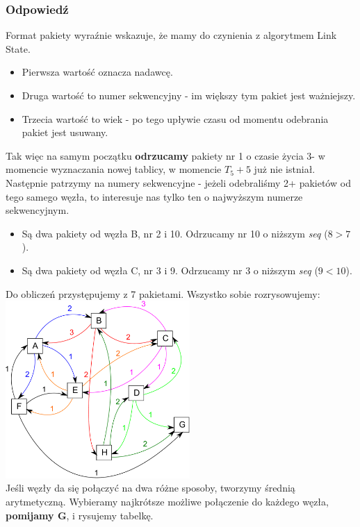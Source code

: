 		\subsubsection{Odpowiedź}
			Format pakiety wyraźnie wskazuje, że mamy do czynienia z algorytmem Link State.
			\begin{itemize}
				\item Pierwsza wartość oznacza nadawcę.
				\item Druga wartość to numer sekwencyjny - im większy tym pakiet jest ważniejszy.
				\item Trzecia wartość to wiek - po tego upływie czasu od momentu odebrania pakiet jest usuwany.
			\end{itemize}
			Tak więc na samym początku \textbf{odrzucamy} pakiety nr 1 o czasie życia 3- w momencie wyznaczania nowej tablicy, w momencie $ T_5+5 $ już nie istniał.\\
			Następnie patrzymy na numery sekwencyjne - jeżeli odebraliśmy 2+ pakietów od tego samego węzła, to interesuje nas tylko ten o najwyższym numerze sekwencyjnym.
			\begin{itemize}
				\item Są dwa pakiety od węzła B, nr 2 i 10. Odrzucamy nr 10 o niższym \textit{seq} ($ 8 > 7 $).
				\item Są dwa pakiety od węzła C, nr 3 i 9. Odrzucamy nr 3 o niższym \textit{seq} ($ 9 < 10 $).
			\end{itemize}
			Do obliczeń przystępujemy z 7 pakietami. Wszystko sobie rozrysowujemy:\\
			\includegraphics[width=7.0cm]{./images/zadanie05.pdf}\\
			Jeśli węzły da się połączyć na dwa różne sposoby, tworzymy średnią arytmetyczną. Wybieramy najkrótsze możliwe połączenie do każdego węzła, \textbf{pomijamy G}, i rysujemy tabelkę.\\\\
